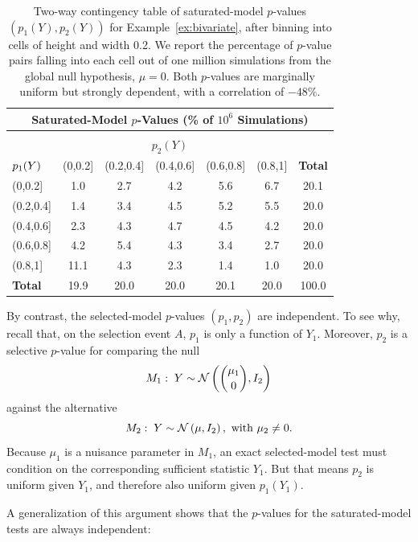 \documentclass{article}
\begin{document}
\begin{table}[ht]
  \centering
  \begin{tabular}{l|ccccc|c}
    \multicolumn{7}{c}{Saturated-Model $p$-Values 
      (\% of $10^6$ Simulations)}\\[7pt]
    \hline
    \multicolumn{7}{c}{}\\[-1.5ex]
    \multicolumn{7}{c}{$p_2(Y)$}\\[5pt]
    ${\large p_1(Y)}$ & (0,0.2] & (0.2,0.4] & (0.4,0.6] & (0.6,0.8] & (0.8,1] & \textbf{Total} \\ 
    \hline
    (0,0.2] & 1.0 & 2.7 & 4.2 & 5.6 & 6.7 & 20.1 \\ 
    (0.2,0.4] & 1.4 & 3.4 & 4.5 & 5.2 & 5.5 & 20.0 \\ 
    (0.4,0.6] & 2.3 & 4.3 & 4.7 & 4.5 & 4.2 & 20.0 \\ 
    (0.6,0.8] & 4.2 & 5.4 & 4.3 & 3.4 & 2.7 & 20.0 \\ 
    (0.8,1] & 11.1 & 4.3 & 2.3 & 1.4 & 1.0 & 20.0 \\ 
    \hline
    \textbf{Total} & 19.9 & 20.0 & 20.0 & 20.1 & 20.0 & 100.0 \\ 
    \hline
  \end{tabular}
  \caption{Two-way contingency table of saturated-model $p$-values $(p_1(Y), p_2(Y))$ for Example~\ref{ex:bivariate}, after binning into cells of height and width 0.2. We report the percentage of $p$-value pairs falling into each cell out of one million simulations from the global null hypothesis, $\mu=0$. Both $p$-values are marginally uniform but strongly dependent, with a correlation of $-48\%$.}
\label{tab:bv_twoWayTable}
\end{table}

By contrast, the selected-model $p$-values $(p_1,p_2)$ are independent. To see why, recall that, on the selection event $A$, $p_1$ is only a function of $Y_1$. Moreover, $p_2$ is a selective $p$-value for comparing the null
\[
M_1:\; Y \sim \mathcal{N}\left(\binom{\mu_1}{0}, I_2\right)
\]
against the alternative
\[
M_2:\; Y \sim \mathcal{N}\left(\mu, I_2\right), \text{ with } \mu_2 \neq 0.
\]
Because $\mu_1$ is a nuisance parameter in $M_1$, an exact selected-model test must condition on the corresponding sufficient statistic $Y_1$. But that means $p_2$ is uniform given $Y_1$, and therefore also uniform given $p_1(Y_1)$.

A generalization of this argument shows that the $p$-values for the saturated-model tests are always independent:
\end{document}
